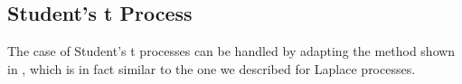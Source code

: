 \documentclass[journal]{IEEEtran}
\begin{document}









\subsection{Student's t Process}
The case of Student's t processes can be handled by adapting the method shown in \cite{fevotte2006bayesian}, which is in fact similar to the one we described for Laplace processes.
\end{document}
